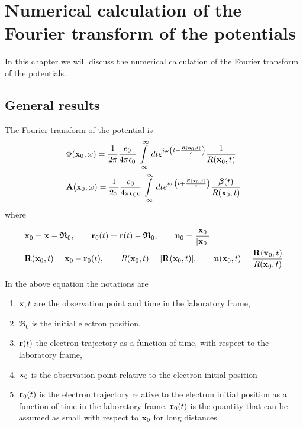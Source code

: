 \chapter{Numerical calculation of the Fourier transform of the potentials}

In this chapter we will discuss the numerical calculation of the Fourier transform of the potentials.



\section{General results}
The Fourier transform of the potential is
\begin{align}
     & \Phi({\bf x}_0,\omega)=\frac1{2\pi}\frac{e_0}{4\pi\epsilon_0}\int\limits_{-\infty}^{\infty}dte^{i\omega\left(t+\frac{R({\bf x}_0,t)}c\right)}\frac1{R({\bf x}_0,t)}                             \\
     & {\bf A}({\bf x}_0,\omega)=\frac1{2\pi}\frac{e_0}{4\pi\epsilon_0c}\int\limits_{-\infty}^{\infty}dte^{i\omega\left(t+\frac{R({\bf x}_0,t)}c\right)}\frac{{\boldsymbol{\beta}}(t)}{R({\bf x}_0,t)}
\end{align}
where
\begin{tcolorbox}[colback=blue!5!white,colframe=blue!75!black]
    \begin{align}
         & {\bf x}_0={\bf x}-{\boldsymbol{\mathfrak{R}}}_0,\qquad {\bf r}_0(t)={\bf r}(t)-{\boldsymbol{\mathfrak{R}}}_0, \qquad {\bf n}_0=\frac{{\bf x}_0}{|{\bf x}_0|}    \nonumber \\
         & {\bf R}({\bf x}_0,t)={\bf x}_0-{\bf r}_0(t),\qquad R({\bf x}_0,t)=|{\bf R}({\bf x}_0,t)|,\qquad {\bf n}({\bf x}_0,t)=\frac{{\bf R}({\bf x}_0,t)}{R({\bf x}_0,t)}
    \end{align}
\end{tcolorbox}
In the above equation the notations are
\begin{tcolorbox}[colback=blue!5!white,colframe=blue!75!black]
    \begin{enumerate}

        \item ${\bf x},t $ are the observation point and time in the laboratory frame,
        \item ${\boldsymbol{\mathfrak{R}}}_0$ is the initial electron position,
        \item ${\bf r}(t)$ the electron trajectory as a function of time, with respect to the laboratory frame,
        \item ${\bf x}_0$ is the observation point relative to the electron initial position
        \item ${\bf r}_0(t)$ is the electron trajectory relative to the electron initial position as a function of time in the laboratory frame. {\color{red}${\bf r}_0(t)$ is the quantity that can be assumed as small with respect to ${\bf x}_0$ for long distances.}
    \end{enumerate}
\end{tcolorbox}


